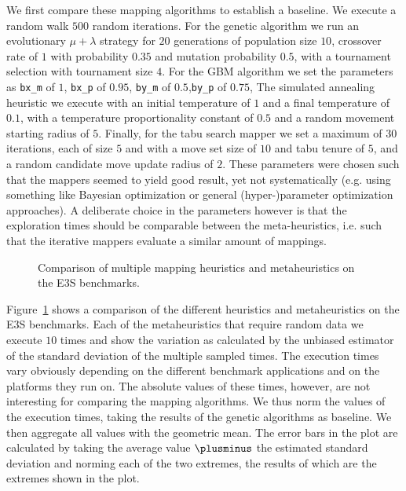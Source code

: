 We first compare these mapping algorithms to establish a baseline. 
We execute a random walk $500$ random iterations.
For the genetic algorithm we run an evolutionary $\mu + \lambda$ strategy for $20$ generations of population size $10$, crossover rate of $1$ with probability $0.35$ and mutation probability $0.5$, with a tournament selection with tournament size $4$.
For the \ac{GBM} algorithm we set the parameters as \texttt{bx\_m} of $1$, \texttt{bx\_p} of $0.95$, \texttt{by\_m} of $0.5$,\texttt{by\_p} of $0.75$, 
The simulated annealing heuristic we execute with an initial temperature of $1$ and a final temperature of $0.1$, with a temperature proportionality constant of $0.5$  and a random movement starting radius of $5$.
Finally, for the tabu search mapper we set a maximum of $30$ iterations, each of size $5$ and with a move set size of $10$ and tabu tenure of $5$, and a random candidate move update radius of $2$.
These parameters were chosen such that the mappers seemed to yield good result, yet not systematically (e.g. using something like Bayesian optimization or general (hyper-)parameter optimization approaches).
A deliberate choice in the parameters however is that the exploration times should be comparable between the meta-heuristics, i.e. such that the iterative mappers evaluate a similar amount of mappings.

\begin{figure}[h]
	\centering
   \resizebox{0.95\textwidth}{!}{}
	\caption{Comparison of multiple mapping heuristics and metaheuristics on the \ac{E3S} benchmarks.}
	\label{fig:metric_comparison}
\end{figure}

Figure~\ref{fig:metric_comparison} shows a comparison of the different heuristics and metaheuristics on the \ac{E3S} benchmarks.
Each of the metaheuristics that require random data we execute $10$ times and show the variation as calculated by the unbiased estimator of the standard deviation of the multiple sampled times.
The execution times vary obviously depending on the different benchmark applications and on the platforms they run on.
The absolute values of these times, however, are not interesting for comparing the mapping algorithms.
We thus norm the values of the execution times, taking the results of the genetic algorithms as baseline.
We then aggregate all values with the geometric mean.
The error bars in the plot are calculated by taking the average value $\plusminus$ the estimated standard deviation and norming each of the two extremes, the results of which are the extremes shown in the plot.

